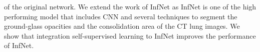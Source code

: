 of the original network. We extend the work of InfNet as InfNet is one of the high performing model that includes CNN and several techniques to segment the ground-glass opacities and the consolidation area of the CT lung images. We show that integration self-supervised learning to InfNet improves the performance of InfNet.